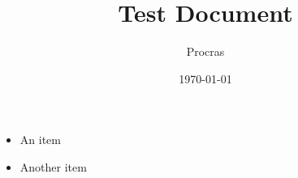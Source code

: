 \documentclass[a4paper]{article}
\title{Test Document}
\author{Procras}
\date{\today}
\begin{document}
\maketitle

\begin{itemize}
    \item An item
    \item Another item
\end{itemize}
\end{document}
